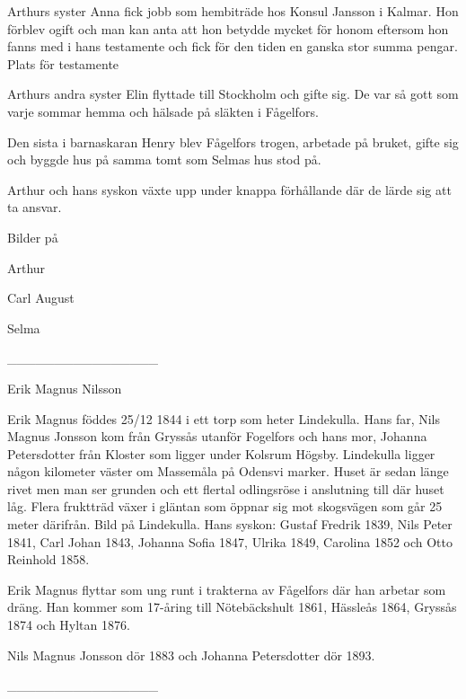 Arthurs syster Anna fick jobb som hembiträde hos Konsul Jansson i Kalmar. Hon förblev ogift och man kan anta att hon betydde mycket för honom eftersom hon fanns med i hans testamente och fick för den tiden en ganska stor summa pengar.
Plats för testamente


Arthurs andra syster Elin flyttade till Stockholm och gifte sig. De var så gott som varje sommar hemma och hälsade på släkten i Fågelfors.


Den sista i barnaskaran Henry blev Fågelfors trogen, arbetade på bruket, gifte sig och byggde hus på samma tomt som Selmas hus stod på.


Arthur och hans syskon växte upp under knappa förhållande där de lärde sig att ta ansvar.


Bilder på


Arthur




Carl August




Selma
















 
________________


Erik Magnus Nilsson


Erik Magnus föddes 25/12 1844 i ett torp som heter Lindekulla. Hans far, Nils Magnus Jonsson kom från Gryssås utanför Fogelfors och hans mor, Johanna Petersdotter från Kloster som ligger under Kolsrum Högsby. Lindekulla ligger någon kilometer väster om Massemåla på Odensvi marker. Huset är sedan länge rivet men man ser grunden och ett flertal odlingsröse i anslutning till där huset låg. Flera fruktträd växer i gläntan som öppnar sig mot skogsvägen som går 25 meter därifrån.
Bild på Lindekulla.
Hans syskon: Gustaf Fredrik 1839, Nils Peter 1841, Carl Johan 1843, Johanna Sofia 1847, Ulrika 1849, Carolina 1852 och Otto Reinhold 1858.


Erik Magnus flyttar som ung runt i trakterna av Fågelfors där han arbetar som dräng. Han kommer som 17-åring till Nötebäckshult 1861, Hässleås 1864, Gryssås 1874 och Hyltan 1876.   


Nils Magnus Jonsson dör 1883 och Johanna Petersdotter dör 1893.




________________


